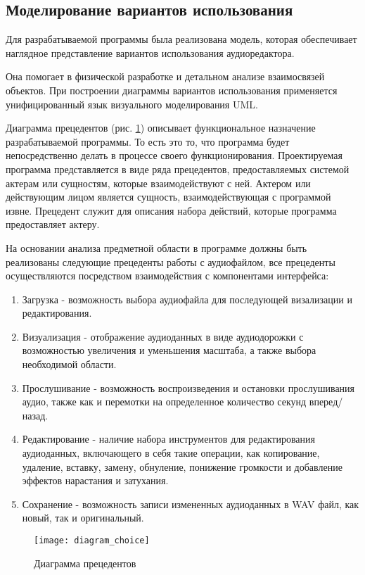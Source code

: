 \subsection{Моделирование вариантов использования}

Для разрабатываемой программы была реализована модель, которая обеспечивает наглядное представление вариантов использования аудиоредактора.

Она помогает в физической разработке и детальном анализе взаимосвязей объектов. При построении диаграммы вариантов использования применяется унифицированный язык визуального моделирования UML.

Диаграмма прецедентов (рис. \ref{diagram_choice:image}) описывает функциональное назначение разрабатываемой программы. То есть это то, что программа будет непосредственно делать в процессе своего функционирования. Проектируемая программа представляется в виде ряда прецедентов, предоставляемых системой актерам или сущностям, которые взаимодействуют с ней. Актером или действующим лицом является сущность, взаимодействующая с программой извне. Прецедент служит для описания набора действий, которые программа предоставляет актеру. 

На основании анализа предметной области в программе должны быть реализованы следующие прецеденты работы с аудиофайлом, все прецеденты осуществляются посредством взаимодействия с компонентами интерфейса:
\begin{enumerate}
\item Загрузка - возможность выбора аудиофайла для последующей визализации и редактирования.
\item Визуализация - отображение аудиоданных в виде аудиодорожки с возможностью увеличения и уменьшения масштаба, а также выбора необходимой области.
\item Прослушивание - возможность воспроизведения и остановки прослушивания аудио, также как и перемотки на определенное количество секунд вперед/назад.
\item Редактирование - наличие набора инструментов для редактирования аудиоданных, включающего в себя такие операции, как копирование, удаление, вставку, замену, обнуление, понижение громкости и добавление эффектов нарастания и затухания.
\item Сохранение - возможность записи измененных аудиоданных в WAV файл, как новый, так и оригинальный.
\end{enumerate}

\begin{figure}[ht]
	\texttt{[image: diagram\_choice]}
	\caption{Диаграмма прецедентов}
	\label{diagram_choice:image}
\end{figure}

